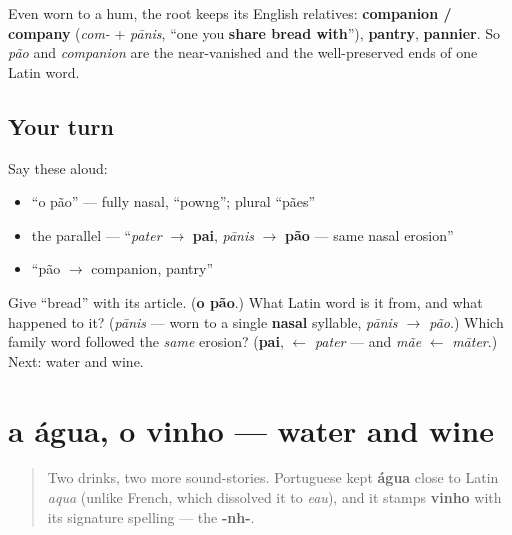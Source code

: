\begin{cousinweb}
Even worn to a hum, the root keeps its English relatives: \textbf{companion / company} (\emph{com-} + \emph{pānis}, \textquotedblleft{}one you \textbf{share bread with}\textquotedblright{}), \textbf{pantry}, \textbf{pannier}. So \emph{pão} and \emph{companion} are the near-vanished and the well-preserved ends of one Latin word.
\end{cousinweb}

\subsection*{Your turn}
Say these aloud:

\begin{itemize}
\raggedright
  \item \textquotedblleft{}o pão\textquotedblright{} — fully nasal, \textquotedblleft{}powng\textquotedblright{}; plural \textquotedblleft{}pães\textquotedblright{}
  \item the parallel — \textquotedblleft{}\emph{pater} $\to$ \textbf{pai}, \emph{pānis} $\to$ \textbf{pão} — same nasal erosion\textquotedblright{}
  \item \textquotedblleft{}pão $\to$ companion, pantry\textquotedblright{}
\end{itemize}

\begin{tcolorbox}[breakable,colback=teal!4,colframe=teal!35!black,title={Before you move on}]
Give \textquotedblleft{}bread\textquotedblright{} with its article. (\textbf{o pão}.) What Latin word is it from, and what happened to it? (\emph{pānis} — worn to a single \textbf{nasal} syllable, \emph{pānis $\to$ pão}.) Which family word followed the \emph{same} erosion? (\textbf{pai}, $\leftarrow$ \emph{pater} — and \emph{mãe} $\leftarrow$ \emph{māter}.) Next: water and wine.
\end{tcolorbox}
\section[a água, o vinho]{a água, o vinho — water and wine}

\label{lesson:PT-C11-agua-vinho}



\begin{quote}
Two drinks, two more sound-stories. Portuguese kept \textbf{água} close to Latin \emph{aqua} (unlike French, which dissolved it to \emph{eau}), and it stamps \textbf{vinho} with its signature spelling — the \textbf{-nh-}.
\end{quote}

